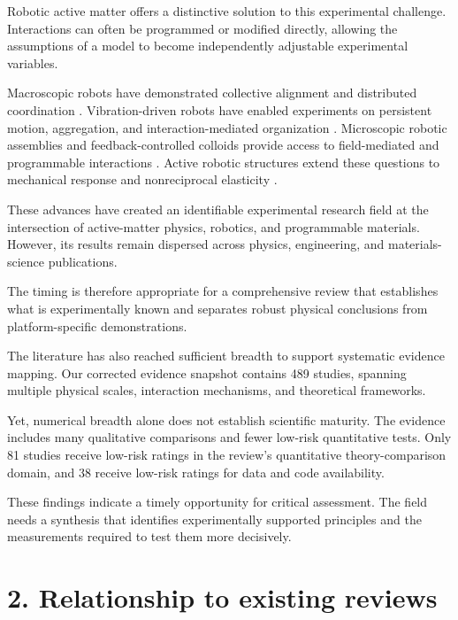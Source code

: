 Robotic active matter offers a distinctive solution
to this experimental challenge. Interactions can
often be programmed or modified directly, allowing
the assumptions of a model to become independently
adjustable experimental variables.

Macroscopic robots have demonstrated collective
alignment and distributed coordination
\cite{Turgut2008selforganizedflocka,Vsrhelyi2018optimizedflockingo,Zhou2024anticipationpromote}.
Vibration-driven robots have enabled experiments
on persistent motion, aggregation, and
interaction-mediated organization
\cite{Welch2018aggregatesuppressio,Deblais2019howtoforceanarmy,Chvykov2020lowrattlingapred}.
Microscopic robotic assemblies and
feedback-controlled colloids provide access
to field-mediated and programmable interactions
\cite{Xie2020bioinspiredsoftmic,Pauer2021programmabledesign,Buerle2020formationofstable,Heuthe2025tunablecolloidalsw}.
Active robotic structures extend these
questions to mechanical response and
nonreciprocal elasticity
\cite{Brandenbourger2021limitcyclesturnac,Coulais2025activemetamaterials}.

These advances have created an identifiable
experimental research field at the intersection
of active-matter physics, robotics, and
programmable materials. However, its results
remain dispersed across physics, engineering,
and materials-science publications.

The timing is therefore appropriate for
a comprehensive review that establishes
what is experimentally known and separates
robust physical conclusions from
platform-specific demonstrations.

The literature has also reached sufficient
breadth to support systematic evidence mapping.
Our corrected evidence snapshot contains
489 studies, spanning multiple physical scales,
interaction mechanisms, and theoretical
frameworks.

Yet, numerical breadth alone does not establish
scientific maturity. The evidence includes
many qualitative comparisons and fewer
low-risk quantitative tests. Only 81 studies
receive low-risk ratings in the review's
quantitative theory-comparison domain,
and 38 receive low-risk ratings for
data and code availability.

These findings indicate a timely opportunity
for critical assessment. The field needs
a synthesis that identifies experimentally
supported principles and the measurements
required to test them more decisively.

\section*{2. Relationship to existing reviews}

